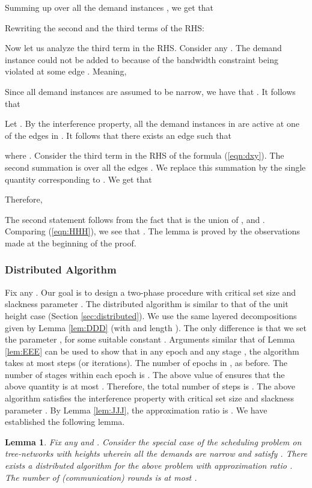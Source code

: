 \documentclass[11pt]{article}
\newtheorem{lemma}[theorem]{\bf Lemma}
\newcommand{\qed} {\hfill}
\begin{document}
Summing up  over all the demand instances , we get that

Rewriting the second and the third terms of the RHS:

Now let us analyze the third term in the RHS.
Consider any .
The demand instance  could not be added to  because of the bandwidth constraint being
violated at some edge . Meaning,

Since all demand instances are assumed to be narrow, we have that . 
It follows that 

Let .
By the interference property, all the demand instances in  are active
at one of the edges in .
It follows that there exists an edge  such that 

where .
Consider the third term in the RHS of the formula (\ref{eqn:dxy}).
The second summation is over all the edges .
We replace this summation by the single quantity corresponding to .
We get that

Therefore,

The second statement follows from the fact that  is the union of ,  and .
Comparing (\ref{eqn:HHH}), we see that .
The lemma is proved by the observations made at the beginning of the proof.
\qed

\subsubsection*{Distributed Algorithm}
Fix any . 
Our goal is to design a two-phase procedure with critical set size  and slackness parameter 
.
The distributed algorithm is similar to that of the unit height case (Section \ref{sec:distributed}).
We use the same layered decompositions given by Lemma \ref{lem:DDD} (with  and length ).
The only difference is that we set the parameter , for some suitable constant .
Arguments similar that of Lemma \ref{lem:EEE} can be used to show that in any epoch  and any stage ,
the algorithm takes at most  steps (or iterations).
The number of epochs in , as before.
The number of stages within each epoch is .
The above value of  ensures that the above quantity is at most .
Therefore, the total number of steps is 
.
The above algorithm satisfies the interference property with critical set size  and slackness
parameter . By Lemma \ref{lem:JJJ}, 
the approximation ratio is .
We have established the following lemma.

\begin{lemma}
\label{lem:KKK}
Fix any  and . Consider the special case of the scheduling problem on tree-networks
with heights wherein all the demands  are narrow and satisfy .
There exists a distributed algorithm for the above problem with approximation ratio .
The number of (communication) rounds is at most 
.
\end{lemma}
\end{document}
